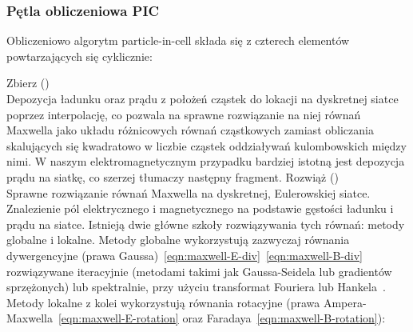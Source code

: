     \subsubsection{Pętla obliczeniowa PIC}
    Obliczeniowo algorytm particle-in-cell składa się z czterech elementów
    powtarzających się cyklicznie:
    \begin{itemize}
        \itemi{} Zbierz ()\\
    Depozycja ładunku oraz prądu z położeń cząstek do lokacji na dyskretnej
    siatce poprzez interpolację, co pozwala na sprawne rozwiązanie na niej
    równań Maxwella jako układu różnicowych równań cząstkowych zamiast
    obliczania skalujących się kwadratowo w liczbie cząstek oddziaływań
    kulombowskich między nimi.  W naszym elektromagnetycznym przypadku bardziej
    istotną jest depozycja prądu na siatkę, co szerzej tłumaczy następny
    fragment.
    \itemi{} Rozwiąż ()\\
    Sprawne rozwiązanie równań Maxwella na dyskretnej, Eulerowskiej siatce.
    Znalezienie pól elektrycznego i magnetycznego na podstawie gęstości ładunku
    i prądu na siatce.  Istnieją dwie główne szkoły rozwiązywania tych równań:
    metody globalne i lokalne. Metody globalne wykorzystują zazwyczaj równania
    dywergencyjne (prawa Gaussa)~\ref{eqn:maxwell-E-div}~\ref{eqn:maxwell-B-div}
    rozwiązywane iteracyjnie (metodami takimi jak Gaussa-Seidela lub gradientów
    sprzężonych)
     lub spektralnie, przy użyciu transformat Fouriera lub Hankela~\cite{fbpic}.
     Metody lokalne z kolei
    wykorzystują równania rotacyjne (prawa Ampera-Maxwella~\ref{eqn:maxwell-E-rotation}
    oraz Faradaya~\ref{eqn:maxwell-B-rotation}):


\end{itemize}
